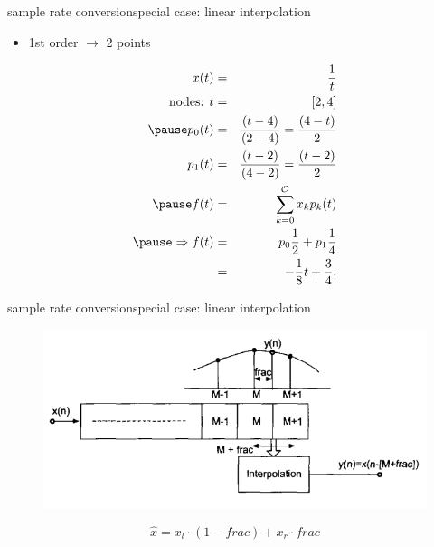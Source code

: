	\begin{frame}{sample rate conversion}{special case: linear interpolation}
        \begin{itemize}
            \item   1st order $\rightarrow$ 2 points
        \end{itemize}
        \begin{footnotesize}
        \begin{eqnarray*}
            x(t) &=& \frac{1}{t}\\
            \text{nodes: } t &=& [2, 4]\\
            \pause
            p_0(t) &=& \frac{(t-4)}{(2-4)} = \frac{(4-t)}{2}\\
            p_1(t) &=& \frac{(t-2)}{(4-2)} = \frac{(t-2)}{2}\\
            \pause
             f(t) &=& \sum\limits_{k=0}^\mathcal{O}x_k p_k(t)\\
            \pause
            \Rightarrow f(t) &=& p_0\frac{1}{2}+p_1\frac{1}{4}\\
            &=& - \frac{1}{8}t + \frac{3}{4}.
        \end{eqnarray*}
         \end{footnotesize}
    \end{frame}
	\begin{frame}{sample rate conversion}{special case: linear interpolation}
        \begin{figure}
            \begin{center}
                \includegraphics[scale=0.4]{Graph/src_lininterpol}
            \end{center}
        \end{figure}
        
        \begin{equation*}
            \hat{x} = x_l\cdot (1-frac) + x_r\cdot frac
        \end{equation*}
    \end{frame}
